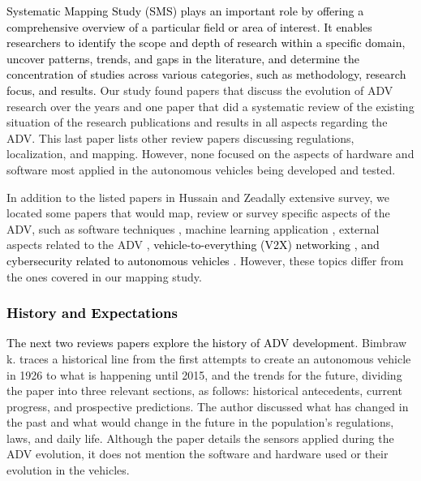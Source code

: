 \documentclass[lettersize,journal]{IEEEtran}
\begin{document}
\textcolor{black} {
Systematic Mapping Study (SMS) plays an important role by offering a comprehensive overview of a particular field or area of interest. It enables researchers to identify the scope and depth of research within a specific domain, uncover patterns, trends, and gaps in the literature, and determine the concentration of studies across various categories, such as methodology, research focus, and results. } Our study found papers \cite{Bimbraw2015,Rosenzweig2015} that discuss the evolution of ADV research over the years and one paper \cite{Hussain2019} that did a systematic review of the existing situation of the research publications and results in all aspects regarding the ADV. This last paper lists other review papers discussing regulations, localization, and mapping. However, none focused on the aspects of hardware and software most applied in the autonomous vehicles being developed and tested.

In addition to the listed papers in Hussain and Zeadally \cite{Hussain2019} extensive survey, we located some papers that would map, review or survey specific aspects of the ADV, such as software techniques \cite{Bresson2017,Paden2016,Bevly2016}, machine learning application \cite{Mozaffari2020,Aradi2020}, external aspects related to the ADV \cite{Barnett2020,ElKhatib2020,Brito2017}, \textcolor{black}{vehicle-to-everything (V2X) networking \cite{hakak2023,ahangar2021,wu2023}, and cybersecurity related to autonomous vehicles \cite{PHAM2021, KIM2021, LIMBASIYA2022, sun2022} }. However, these topics differ from the ones covered in our mapping study.

\vspace{1em}

\subsubsection {\textcolor{black}{\textbf{History and Expectations}}}

\leavevmode\vspace{0.1\baselineskip}%

\textcolor{black}{The next two reviews papers explore the history of ADV development}. Bimbraw k. \cite{Bimbraw2015} traces a historical line from the first attempts to create an autonomous vehicle in 1926 to what is happening until 2015, and the trends for the future, dividing the paper into three relevant sections, as follows: historical antecedents, current progress, and prospective predictions. The author discussed what has changed in the past and what would change in the future in the population's regulations, laws, and daily life. Although the paper details the sensors applied during the ADV evolution, it does not mention the software and hardware used or their evolution in the vehicles. 
\end{document}
